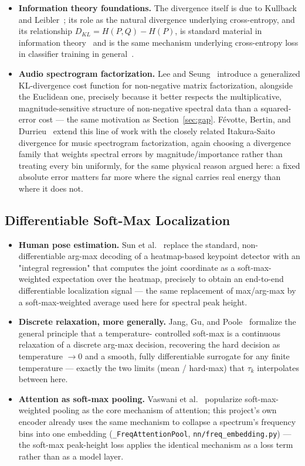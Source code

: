 \documentclass[11pt,a4paper]{article}
\begin{document}
\begin{itemize}[leftmargin=1.4em]
\item \textbf{Information theory foundations.} The divergence itself is due
to Kullback and Leibler~\cite{kullback1951}; its role as the natural
divergence underlying cross-entropy, and its relationship $D_{KL}=H(P,Q)-H(P)$,
is standard material in information theory~\cite{cover2006} and is the same
mechanism underlying cross-entropy loss in classifier training in
general~\cite{goodfellow2016}.
\item \textbf{Audio spectrogram factorization.} Lee and
Seung~\cite{lee2001} introduce a generalized KL-divergence cost function for
non-negative matrix factorization, alongside the Euclidean one, precisely
because it better respects the multiplicative, magnitude-sensitive structure
of non-negative spectral data than a squared-error cost — the same
motivation as Section~\ref{sec:gap}. Févotte, Bertin, and
Durrieu~\cite{fevotte2009} extend this line of work with the closely related
Itakura-Saito divergence for music spectrogram factorization, again choosing
a divergence family that weights spectral errors by magnitude/importance
rather than treating every bin uniformly, for the same physical reason
argued here: a fixed absolute error matters far more where the signal
carries real energy than where it does not.
\end{itemize}

\subsection{Differentiable Soft-Max Localization}

\begin{itemize}[leftmargin=1.4em]
\item \textbf{Human pose estimation.} Sun et
al.~\cite{sun2018} replace the standard, non-differentiable arg-max
decoding of a heatmap-based keypoint detector with an "integral regression"
that computes the joint coordinate as a soft-max-weighted expectation over
the heatmap, precisely to obtain an end-to-end differentiable localization
signal — the same replacement of max/arg-max by a soft-max-weighted average
used here for spectral peak height.
\item \textbf{Discrete relaxation, more generally.} Jang, Gu, and
Poole~\cite{jang2017} formalize the general principle that a temperature-
controlled soft-max is a continuous relaxation of a discrete arg-max
decision, recovering the hard decision as temperature $\to 0$ and a smooth,
fully differentiable surrogate for any finite temperature — exactly the two
limits (mean / hard-max) that $\tau_k$ interpolates between here.
\item \textbf{Attention as soft-max pooling.} Vaswani et
al.~\cite{vaswani2017} popularize soft-max-weighted pooling as the core
mechanism of attention; this project's own encoder already uses the same
mechanism to collapse a spectrum's frequency bins into one embedding
(\texttt{\_FreqAttentionPool}, \texttt{nn/freq\_embedding.py}) — the
soft-max peak-height loss applies the identical mechanism as a loss term
rather than as a model layer.
\end{itemize}
\end{document}
